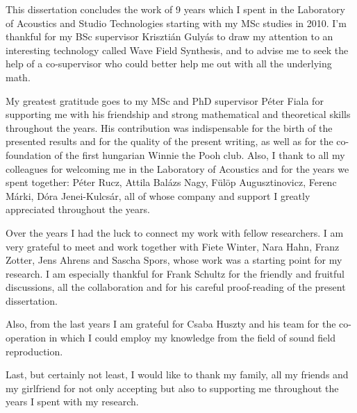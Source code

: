 This dissertation concludes the work of 9 years which I spent in the Laboratory of Acoustics and Studio Technologies starting with my MSc studies in 2010.
I'm thankful for my BSc supervisor Krisztián Gulyás to draw my attention to an interesting technology called Wave Field Synthesis, and to advise me to seek the help of a co-supervisor who could better help me out with all the underlying math.

My greatest gratitude goes to my MSc and PhD supervisor Péter Fiala for supporting me with his friendship and strong mathematical and theoretical skills throughout the years.
His contribution was indispensable for the birth of the presented results and for the quality of the present writing, as well as for the co-foundation of the first hungarian Winnie the Pooh club.
Also, I thank to all my colleagues for welcoming me in the Laboratory of Acoustics and for the years we spent together: Péter Rucz, Attila Balázs Nagy, Fülöp Augusztinovicz, Ferenc Márki, Dóra Jenei-Kulcsár, all of whose company and support I greatly appreciated throughout the years.

Over the years I had the luck to connect my work with fellow researchers.
I am very grateful to meet and work together with Fiete Winter, Nara Hahn, Franz Zotter, Jens Ahrens and Sascha Spors, whose work was a starting point for my research.
I am especially thankful for Frank Schultz for the friendly and fruitful discussions, all the collaboration and for his careful proof-reading of the present dissertation.

Also, from the last years I am grateful for Csaba Huszty and his team for the co-operation in which I could employ my knowledge from the field of sound field reproduction.

Last, but certainly not least, I would like to thank my family, all my friends and my girlfriend for not only accepting but also to supporting me throughout the years I spent with my research.